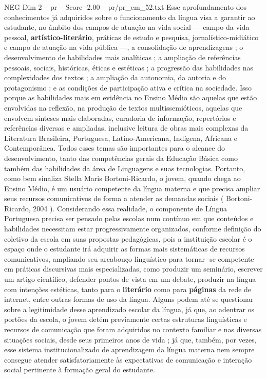 \begin{textsample}{NEG Dim 2 – pr – Score -2.00 – pr/pr\_em\_52.txt}
Esse aprofundamento dos conhecimentos já adquiridos sobre o funcionamento da língua visa a garantir ao estudante, no âmbito dos campos de atuação na vida social — campo da vida pessoal, \textbf{artístico-literário}, práticas de estudo e pesquisa, jornalístico-midiático e campo de atuação na vida pública —, a consolidação de aprendizagens ; o desenvolvimento de habilidades mais analíticas ; a ampliação de referências pessoais, sociais, históricas, éticas e estéticas ; a progressão das habilidades nas complexidades dos textos ; a ampliação da autonomia, da autoria e do protagonismo ; e as condições de participação ativa e crítica na sociedade.
Isso porque as habilidades mais em evidência no Ensino Médio são aquelas que estão envolvidas na reflexão, na produção de textos multissemióticos, aquelas que envolvem sínteses mais elaboradas, curadoria de informação, repertórios e referências diversas e ampliadas, inclusive leitura de obras mais complexas da Literatura Brasileira, Portuguesa, Latino-Americana, Indígena, Africana e Contemporânea.
Todos esses temas são importantes para o alcance do desenvolvimento, tanto das competências gerais da Educação Básica como também das habilidades da área de Linguagens e suas tecnologias.
Portanto, como bem sinaliza Stella Maris Bortoni-Ricardo, o jovem, quando chega ao Ensino Médio, é um usuário competente da língua materna e que precisa ampliar seus recursos comunicativos de forma a atender as demandas sociais ( Bortoni-Ricardo, 2004 ).
Considerando essa realidade, o componente de Língua Portuguesa precisa ser pensado pelas escolas num contínuo em que conteúdos e habilidades necessitam estar progressivamente organizados, conforme definição do coletivo da escola em suas propostas pedagógicas, pois a instituição escolar é o espaço onde o estudante irá adquirir as formas mais sistemáticas de recursos comunicativos, ampliando seu arcabouço linguístico para tornar -se competente em práticas discursivas mais especializadas, como produzir um seminário, escrever um artigo científico, defender pontos de vista em um debate, produzir na língua com intenções estéticas, tanto para o \textbf{literário} como para \textbf{páginas} da rede de internet, entre outras formas de uso da língua.
Alguns podem até se questionar sobre a legitimidade desse aprendizado escolar da língua, já que, ao adentrar os portões da escola, o jovem detém previamente certas estruturas linguísticas e recursos de comunicação que foram adquiridos no contexto familiar e nas diversas situações sociais, desde seus primeiros anos de vida ; já que, também, por vezes, esse sistema institucionalizado de aprendizagem da língua materna nem sempre consegue atender satisfatoriamente às expectativas de comunicação e interação social pertinente à formação geral do estudante.

\end{textsample}
